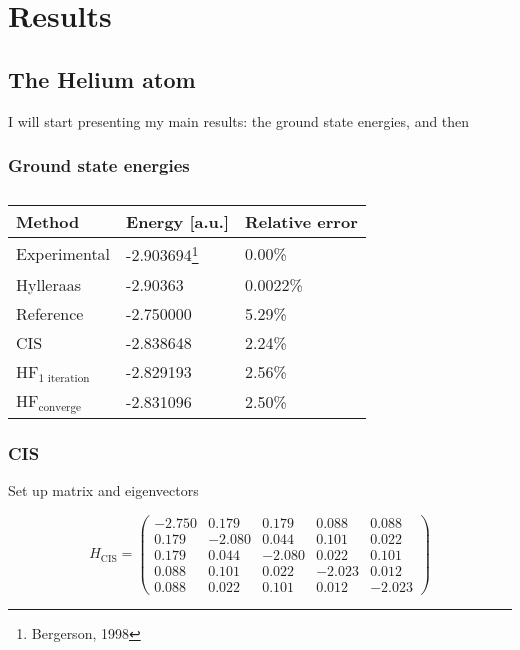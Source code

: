 \section{Results} \label{sec:results}


\subsection{The Helium atom}
I will start presenting my main results: the ground state energies, and then 

\subsubsection{Ground state energies}
\begin{table} [H]
	\caption{}
	\begin{tabularx}{\textwidth}{X|X|X} \hline\hline
		\textbf{Method}&\textbf{Energy} [a.u.]&\textbf{Relative error}\\ \hline
		Experimental & -2.903694\footnote{Bergerson, 1998} & 0.00\%  \\
		Hylleraas & -2.90363 & 0.0022\% \\
		Reference & -2.750000 & 5.29\% \\
		CIS & -2.838648 &  2.24\% \\
		HF$_{\text{1 iteration}}$ & -2.829193 & 2.56\% \\
		HF$_{\text{converge}}$ & -2.831096 & 2.50\% \\ \hline\hline
	\end{tabularx}
\end{table}

\subsubsection{CIS}
Set up matrix and eigenvectors

\begin{equation}
\hat{H}_{\text{CIS}}=
\begin{pmatrix}
-2.750 & 0.179 & 0.179 & 0.088 & 0.088\\
0.179 & -2.080 & 0.044 & 0.101 & 0.022\\
0.179 & 0.044 & -2.080 & 0.022 & 0.101\\
0.088 & 0.101 & 0.022 & -2.023 & 0.012\\
0.088 & 0.022 & 0.101 & 0.012 & -2.023
\end{pmatrix}
\label{eq:H_He}
\end{equation}

